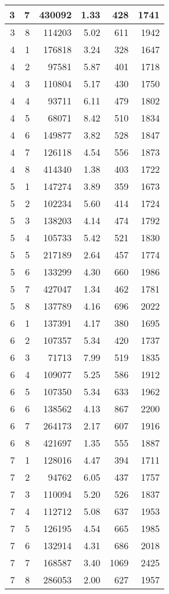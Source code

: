 \documentclass[10pt,twocolumn,a4paper]{article}
\begin{document}
\begin{table}[thb]
{\begin{tabular}{|r|r|r|r|r|r|}
\\ \hline
 3 & 7 & 430092 & 1.33 & 428 & 1741
\\ \hline
 3 & 8 & 114203 & 5.02 & 611 & 1942
\\ \hline
 4 & 1 & 176818 & 3.24 & 328 & 1647
\\ \hline
 4 & 2 & 97581  & 5.87 & 401 & 1718
\\ \hline
 4 & 3 & 110804 & 5.17 & 430 & 1750
\\ \hline
 4 & 4 & 93711  & 6.11 & 479 & 1802
\\ \hline
 4 & 5 & 68071  & 8.42 & 510 & 1834
\\ \hline
 4 & 6 & 149877 & 3.82 & 528 & 1847
\\ \hline
 4 & 7 & 126118 & 4.54 & 556 & 1873
\\ \hline
 4 & 8 & 414340 & 1.38 & 403 & 1722
\\ \hline
 5 & 1 & 147274 & 3.89 & 359 & 1673
\\ \hline
 5 & 2 & 102234 & 5.60 & 414 & 1724
\\ \hline
 5 & 3 & 138203 & 4.14 & 474 & 1792
\\ \hline
 5 & 4 & 105733 & 5.42 & 521 & 1830
\\ \hline
 5 & 5 & 217189 & 2.64 & 457 & 1774
\\ \hline
 5 & 6 & 133299 & 4.30 & 660 & 1986
\\ \hline
 5 & 7 & 427047 & 1.34 & 462 & 1781
\\ \hline
 5 & 8 & 137789 & 4.16 & 696 & 2022
\\ \hline
 6 & 1 & 137391 & 4.17 & 380 & 1695
\\ \hline
 6 & 2 & 107357 & 5.34 & 420 & 1737
\\ \hline
 6 & 3 & 71713  & 7.99 & 519 & 1835
\\ \hline
 6 & 4 & 109077 & 5.25 & 586 & 1912
\\ \hline
 6 & 5 & 107350 & 5.34 & 633 & 1962
\\ \hline
 6 & 6 & 138562 & 4.13 & 867 & 2200
\\ \hline
 6 & 7 & 264173 & 2.17 & 607 & 1916
\\ \hline
 6 & 8 & 421697 & 1.35 & 555 & 1887
\\ \hline
 7 & 1 & 128016 & 4.47 & 394 & 1711
\\ \hline
 7 & 2 & 94762  & 6.05 & 437 & 1757
\\ \hline
 7 & 3 & 110094 & 5.20 & 526 & 1837
\\ \hline
 7 & 4 & 112712 & 5.08 & 637 & 1953
\\ \hline
 7 & 5 & 126195 & 4.54 & 665 & 1985
\\ \hline
 7 & 6 & 132914 & 4.31 & 686 & 2018
\\ \hline
 7 & 7 & 168587 & 3.40 & 1069 & 2425
\\ \hline
 7 & 8 & 286053 & 2.00 & 627 & 1957
\\ \hline
\end{tabular}
\clearpage{}
}
\end{table}
\end{document}
